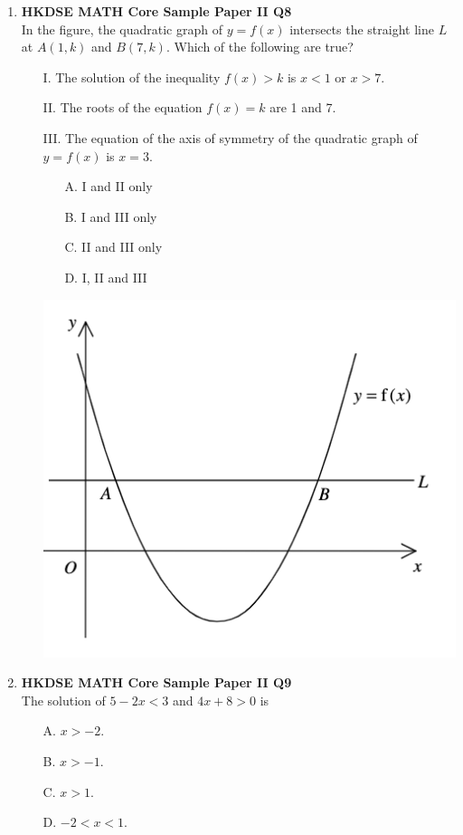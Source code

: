 \documentclass[12pt]{article}
\begin{document}
\begin{enumerate}
	\item \textbf{HKDSE MATH Core Sample Paper II Q8}\\
	In the figure, the quadratic graph of $y = f(x)$ intersects the straight line $L$ at $A(1 , k)$ and $B(7 , k)$. Which of the following are true?
	\begin{enumerate}
		\item[I.] The solution of the inequality $f(x) > k$ is $x < 1$ or $x > 7$.
		\item[II.] The roots of the equation $f(x) = k$ are 1 and 7.
		\item[III.] The equation of the axis of symmetry of the quadratic graph of $y = f(x)$ is $x = 3$.
		\item[]
			\begin{minipage}[u]{.39\textwidth}
				\begin{enumerate}
					\item[A.] I and II only
					\item[B.] I and III only
					\item[C.] II and III only
					\item[D.] I, II and III
				\end{enumerate}
			\end{minipage}
			\begin{minipage}[u]{.5\textwidth}
				\centering
				\includegraphics[scale=0.8]{SPFigure2.8.png}
			\end{minipage}
	\end{enumerate}
		
	\item \textbf{HKDSE MATH Core Sample Paper II Q9}\\
	The solution of $5 - 2x < 3$ and $4x + 8 > 0$ is 
	\begin{enumerate}
		\item[A.] $x > -2$.
		\item[B.] $x > -1$.
		\item[C.] $x > 1$.
		\item[D.] $-2 < x < 1$.
	\end{enumerate}


\end{enumerate}
\end{document}

